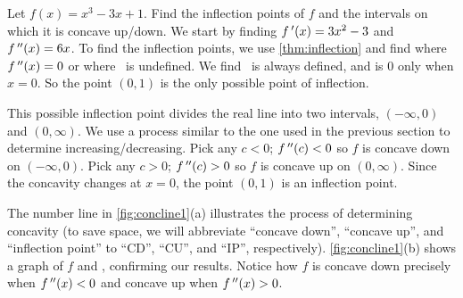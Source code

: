 \begin{example}\label{ex_conc1}%
Let $f(x)=x^3-3x+1$. Find the inflection points of $f$ and the intervals on which it is concave up/down.
\solution
We start by finding $f\,'(x)=3x^2-3$ and $f\,''(x)=6x$.  To find the inflection points, we use \autoref{thm:inflection} and find where $f\,''(x)=0$ or where \fpp\ is undefined. We find \fpp\ is always defined, and is 0 only when $x=0$. So the point $(0,1)$ is the only possible point of inflection.


This possible inflection point divides the real line into two intervals, $(-\infty,0)$ and $(0,\infty)$. We use a process similar to the one used in the previous section to determine increasing/decreasing. Pick any $c<0$; $f\,''(c)<0$ so $f$ is concave down on $(-\infty,0)$. Pick any $c>0$; $f\,''(c)>0$ so $f$ is concave up on $(0,\infty)$. Since the concavity changes at $x=0$, the point $(0,1)$ is an inflection point.

The number line in \autoref{fig:concline1}(a) illustrates the process of determining concavity (to save space, we will abbreviate ``concave down'', ``concave up'', and ``inflection point'' to ``CD'', ``CU'', and ``IP'', respectively). \autoref{fig:concline1}(b) shows a graph of $f$ and \fpp, confirming our results. Notice how $f$ is concave down precisely when $f\,''(x)<0$ and concave up when $f\,''(x)>0$.
\end{example}

